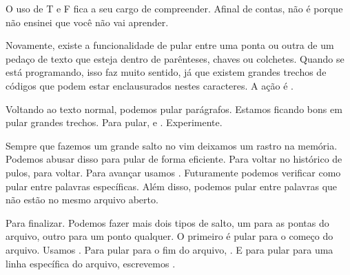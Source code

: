O uso de T e F fica a seu cargo de compreender.
Afinal de contas, não é porque não ensinei que você não vai aprender.


Novamente, existe a funcionalidade de pular entre uma ponta ou outra de um pedaço de
texto que esteja dentro de parênteses, chaves ou colchetes.
Quando se está programando, isso faz muito sentido, já que existem grandes trechos de
códigos que podem estar enclausurados nestes caracteres.
A ação é \vimcommand{\%}.


Voltando ao texto normal, podemos pular parágrafos.
Estamos ficando bons em pular grandes trechos.
Para pular, \vimcommand{\{} e \vimcommand{\}}. Experimente.


Sempre que fazemos um grande salto no vim deixamos um rastro na memória.
Podemos abusar disso para pular de forma eficiente.
Para voltar no histórico de pulos,  para voltar.
Para avançar usamos .
Futuramente podemos verificar como pular entre palavras específicas.
Além disso, podemos pular entre palavras que não estão no mesmo arquivo aberto.

Para finalizar.
Podemos fazer mais dois tipos de salto, um para as pontas do arquivo, outro para um ponto qualquer.
O primeiro é pular para o começo do arquivo.
Usamos .
Para pular para o fim do arquivo, .
E para pular para uma linha específica do arquivo, escrevemos .

